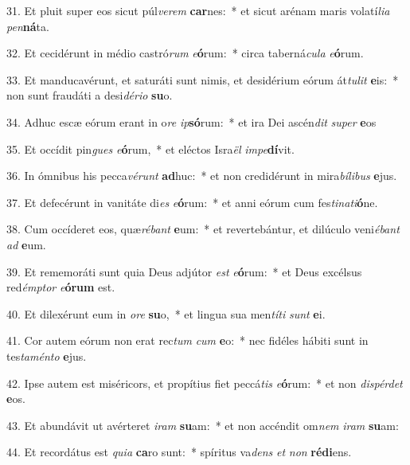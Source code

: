 31. Et pluit super eos sicut púl\textit{ve}\textit{rem} \textbf{car}nes:~*  et sicut arénam maris volatí\textit{li}\textit{a} \textit{pen}\textbf{ná}ta.\

32. Et cecidérunt in médio castró\textit{rum} \textit{e}\textbf{ó}rum:~*  circa taberná\textit{cu}\textit{la} \textit{e}\textbf{ó}rum.\

33. Et manducavérunt, et saturáti sunt nimis, et desidérium eórum át\textit{tu}\textit{lit} \textbf{e}is:~*  non sunt fraudáti a desi\textit{dé}\textit{ri}\textit{o} \textbf{su}o.\

34. Adhuc escæ eórum erant in o\textit{re} \textit{ip}\textbf{só}rum:~*  et ira Dei ascén\textit{dit} \textit{su}\textit{per} \textbf{e}os\

35. Et occídit pin\textit{gues} \textit{e}\textbf{ó}rum,~*  et eléctos Isra\textit{ël} \textit{im}\textit{pe}\textbf{dí}vit.\

36. In ómnibus his pecca\textit{vé}\textit{runt} \textbf{ad}huc:~*  et non credidérunt in mira\textit{bí}\textit{li}\textit{bus} \textbf{e}jus.\

37. Et defecérunt in vanitáte di\textit{es} \textit{e}\textbf{ó}rum:~*  et anni eórum cum fes\textit{ti}\textit{na}\textit{ti}\textbf{ó}ne.\

38. Cum occíderet eos, quæ\textit{ré}\textit{bant} \textbf{e}um:~*  et revertebántur, et dilúculo veni\textit{é}\textit{bant} \textit{ad} \textbf{e}um.\

39. Et rememoráti sunt quia Deus adjútor \textit{est} \textit{e}\textbf{ó}rum:~*  et Deus excélsus red\textit{émp}\textit{tor} \textit{e}\textbf{ó}\textbf{rum} est.\

40. Et dilexérunt eum in \textit{o}\textit{re} \textbf{su}o,~*  et lingua sua men\textit{tí}\textit{ti} \textit{sunt} \textbf{e}i.\

41. Cor autem eórum non erat rec\textit{tum} \textit{cum} \textbf{e}o:~*  nec fidéles hábiti sunt in tes\textit{ta}\textit{mén}\textit{to} \textbf{e}jus.\

42. Ipse autem est miséricors, et propítius fiet peccá\textit{tis} \textit{e}\textbf{ó}rum:~*  et non \textit{dis}\textit{pér}\textit{det} \textbf{e}os.\

43. Et abundávit ut avérteret \textit{i}\textit{ram} \textbf{su}am:~*  et non accéndit om\textit{nem} \textit{i}\textit{ram} \textbf{su}am:\

44. Et recordátus est \textit{qui}\textit{a} \textbf{ca}ro sunt:~*  spíritus va\textit{dens} \textit{et} \textit{non} \textbf{réd}\textbf{i}ens.\

